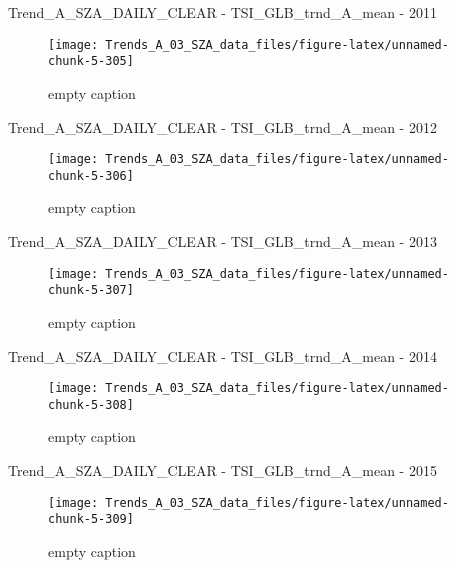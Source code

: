 \documentclass[
  10pt,
  a4paper,oneside]{article}
\begin{document}
Trend\_A\_SZA\_DAILY\_CLEAR - TSI\_GLB\_trnd\_A\_mean - 2011

\begin{figure}[!ht]

{\centering \texttt{[image: Trends\_A\_03\_SZA\_data\_files/figure-latex/unnamed-chunk-5-305]} 

}

\caption{ empty caption }\label{fig:unnamed-chunk-5-305}
\end{figure}

Trend\_A\_SZA\_DAILY\_CLEAR - TSI\_GLB\_trnd\_A\_mean - 2012

\begin{figure}[!ht]

{\centering \texttt{[image: Trends\_A\_03\_SZA\_data\_files/figure-latex/unnamed-chunk-5-306]} 

}

\caption{ empty caption }\label{fig:unnamed-chunk-5-306}
\end{figure}

Trend\_A\_SZA\_DAILY\_CLEAR - TSI\_GLB\_trnd\_A\_mean - 2013

\begin{figure}[!ht]

{\centering \texttt{[image: Trends\_A\_03\_SZA\_data\_files/figure-latex/unnamed-chunk-5-307]} 

}

\caption{ empty caption }\label{fig:unnamed-chunk-5-307}
\end{figure}

Trend\_A\_SZA\_DAILY\_CLEAR - TSI\_GLB\_trnd\_A\_mean - 2014

\begin{figure}[!ht]

{\centering \texttt{[image: Trends\_A\_03\_SZA\_data\_files/figure-latex/unnamed-chunk-5-308]} 

}

\caption{ empty caption }\label{fig:unnamed-chunk-5-308}
\end{figure}

Trend\_A\_SZA\_DAILY\_CLEAR - TSI\_GLB\_trnd\_A\_mean - 2015

\begin{figure}[!ht]

{\centering \texttt{[image: Trends\_A\_03\_SZA\_data\_files/figure-latex/unnamed-chunk-5-309]} 

}

\caption{ empty caption }\label{fig:unnamed-chunk-5-309}
\end{figure}
\end{document}
